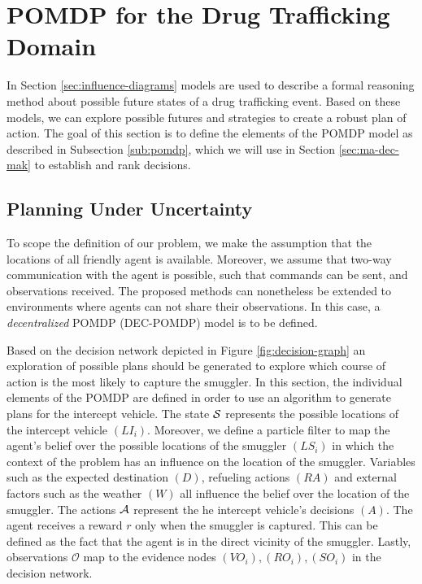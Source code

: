 \documentclass[conference]{IEEEtran}
\begin{document}
\section{POMDP for the Drug Trafficking Domain}
\label{sec:scenario-based-dm}

In Section \ref{sec:influence-diagrams} models are used to describe a formal reasoning method about possible future states of a drug trafficking event. Based on these models, we can explore possible futures and strategies to create a robust plan of action. The goal of this section is to define the elements of the POMDP model as described in Subsection \ref{sub:pomdp}, which we will use in Section \ref{sec:ma-dec-mak} to establish and rank decisions.

\subsection{Planning Under Uncertainty}
\label{sub:plan-uncert}

To scope the definition of our problem, we make the assumption that the locations of all friendly agent is available. Moreover, we assume that two-way communication with the agent is possible, such that commands can be sent, and observations received. The proposed methods can nonetheless be extended to environments where agents can not share their observations. In this case, a \emph{decentralized} POMDP (DEC-POMDP) \cite{dec-pomdp,oliehoek2008optimal} model is to be defined.

Based on the decision network depicted in Figure \ref{fig:decision-graph} an exploration of possible plans should be generated to explore which course of action is the most likely to capture the smuggler. In this section, the individual elements of the POMDP are defined in order to use an algorithm to generate plans for the intercept vehicle. The state $\S$ represents the possible locations of the intercept vehicle $(LI_i)$. Moreover, we define a particle filter to map the agent's belief over the possible locations of the smuggler $(LS_i)$ in which the context of the problem has an influence on the location of the smuggler. Variables such as the expected destination $(D)$, refueling actions $(RA)$ and external factors such as the weather $(W)$ all influence the belief over the location of the smuggler. The actions $\A$ represent the he intercept vehicle's decisions $(A)$. The agent receives a reward $r$ only when the smuggler is captured. This can be defined as the fact that the agent is in the direct vicinity of the smuggler. Lastly, observations $\mathcal{O}$ map to the evidence nodes $(VO_i), (RO_i), (SO_i)$ in the decision network.
\end{document}
